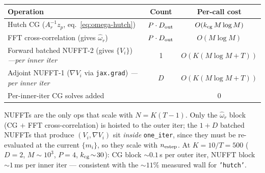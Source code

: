 \documentclass[11pt]{article}
\newcommand{\code}[1]{\texttt{\small #1}}
\begin{document}
{\footnotesize
\begin{tabular}{lcc}
\hline
Operation & Count & Per-call cost \\
\hline
Hutch CG ($A_r^{-1} z_p$, eq.~\ref{eq:omega-hutch})
   & $P\cdot D_{\rm out}$
   & $O(k_{\rm cg}\, M\log M)$ \\
FFT cross-correlation (gives $\hat\omega_r$)
   & $P\cdot D_{\rm out}$
   & $O(M\log M)$ \\
Forward batched NUFFT-2 (gives $\{V_i\}$) \emph{---per inner iter}
   & 1
   & $O(K(M\log M + T))$ \\
Adjoint NUFFT-1 ($\nabla V_i$ via \code{jax.grad}) \emph{---per inner iter}
   & $D$
   & $O(K(M\log M + T))$ \\
\hline
\multicolumn{2}{l}{Per-inner-iter CG solves added}
   & 0 \\
\hline
\end{tabular}}

\medskip
NUFFTs are the only ops that scale with $N=K(T{-}1)$. Only the
$\hat\omega_r$ block (CG $+$ FFT cross-correlation) is hoisted to the
outer iter; the $1{+}D$ batched NUFFTs that produce $(V_i,\nabla V_i)$
sit \emph{inside} \code{one\_iter}, since they must be re-evaluated at
the current $\{m_i\}$, so they scale with $n_{\rm estep}$. At
$K{=}10/T{=}500$ ($D{=}2$, $M\!\sim\!10^3$, $P{=}4$,
$k_{\rm cg}\!\sim\!30$): CG block ${\sim}0.1$\,s per outer iter, NUFFT
block ${\sim}1$\,ms per inner iter --- consistent with the
${\sim}11\%$ measured wall for \code{'hutch'}.
\end{document}
